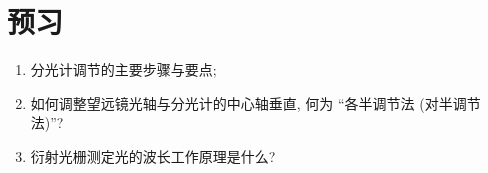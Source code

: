 \documentclass[signature=data]{physicsreport}
\begin{document}
\maketitle

\section{预习}
\begin{enumerate}
    \item 分光计调节的主要步骤与要点;
    \item 如何调整望远镜光轴与分光计的中心轴垂直, 何为 ``各半调节法 (对半调节法)''?
    \item 衍射光栅测定光的波长工作原理是什么?
\end{enumerate}

\makeatletter
{}
\makeatother

\newpage
\end{document}
